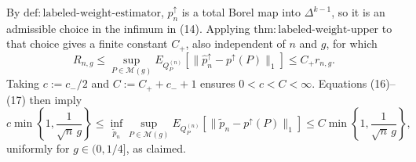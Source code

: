 By \(\mathrm{def:labeled\text{-}weight\text{-}estimator}\), \(\widehat p_n^{\uparrow}\) is a total Borel map into \(\Delta^{k-1}\), so it is an admissible choice in the infimum in (14).  Applying \(\mathrm{thm:labeled\text{-}weight\text{-}upper}\) to that choice gives a finite constant \(C_+\), also independent of \(n\) and \(g\), for which
\[
 R_{n,g}
 \le\sup_{P\in\mathcal M(g)}E_{Q_P^{(n)}}\!\left[
 \lVert\widehat p_n^{\uparrow}-p^{\uparrow}(P)\rVert_1\right]
 \le C_+r_{n,g}.                                                             \tag{17}
\]
Taking \(c:=c_-/2\) and \(C:=C_++c_-+1\) ensures \(0<c<C<\infty\).  Equations (16)--(17) then imply
\[
 c\min\left\{1,\frac1{\sqrt n\,g}\right\}
 \le\inf_{\widetilde p_n}\sup_{P\in\mathcal M(g)}
 E_{Q_P^{(n)}}\!\left[
 \lVert\widetilde p_n-p^{\uparrow}(P)\rVert_1\right]
 \le C\min\left\{1,\frac1{\sqrt n\,g}\right\},
\]
uniformly for \(g\in(0,1/4]\), as claimed.
